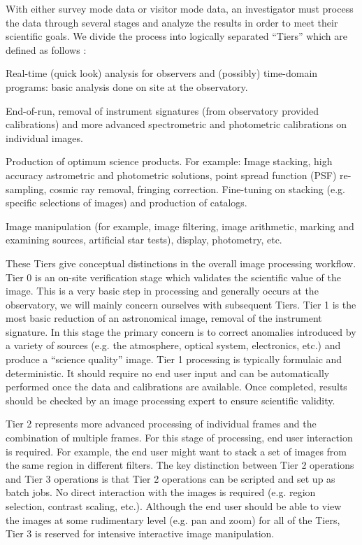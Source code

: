\documentclass[10pt,conference]{IEEEtran}
\begin{document}
With either survey mode data or visitor mode data, an investigator must process the data through several stages and analyze the results in order to meet their scientific goals. We divide the process into logically separated ``Tiers'' which are defined as follows \cite{PASRD}:
\begin{description} 
\item[\bf Tier 0] Real-time (quick look) analysis for observers and (possibly) time-domain
programs: basic analysis done on site at the observatory. 
\item[\bf Tier 1] End-of-run, removal of instrument signatures (from observatory provided calibrations) and more
advanced spectrometric and photometric calibrations on individual images.
\item[\bf Tier 2] Production of optimum science products. For example: Image stacking, high
accuracy astrometric and photometric solutions, point spread function (PSF) re-sampling, cosmic ray removal, fringing correction. Fine-tuning on stacking (e.g. specific selections of images) and production of catalogs.
\item[\bf Tier 3] Image manipulation (for example, image filtering, image arithmetic, marking and
examining sources, artificial star tests), display, photometry, etc.
\end{description}

These Tiers give conceptual distinctions in the overall image processing workflow. Tier 0 is an on-site verification stage which validates the scientific value of the image. This is a very basic step in processing and generally occurs at the observatory, we will mainly concern ourselves with subsequent Tiers. Tier 1 is the most basic reduction of an astronomical image, removal of the instrument signature. In this stage the primary concern is to correct anomalies introduced by a variety of sources (e.g. the atmosphere, optical system, electronics, etc.) and produce a ``science quality'' image. Tier 1 processing is typically formulaic and deterministic. It should require no end user input and can be automatically performed once the data and calibrations are available. Once completed, results should be checked by an image processing expert to ensure scientific validity.

Tier 2 represents more advanced processing of individual frames and the combination of multiple frames. For this stage of processing, end user interaction is required. For example, the end user might want to stack a set of images from the same region in different filters. The key distinction between Tier 2 operations and Tier 3 operations is that Tier 2 operations can be scripted and set up as batch jobs. No direct interaction with the images is required (e.g. region selection, contrast scaling, etc.). Although the end user should be able to view the images at some rudimentary level (e.g. pan and zoom) for all of the Tiers, Tier 3 is reserved for intensive interactive image manipulation.
\end{document}
